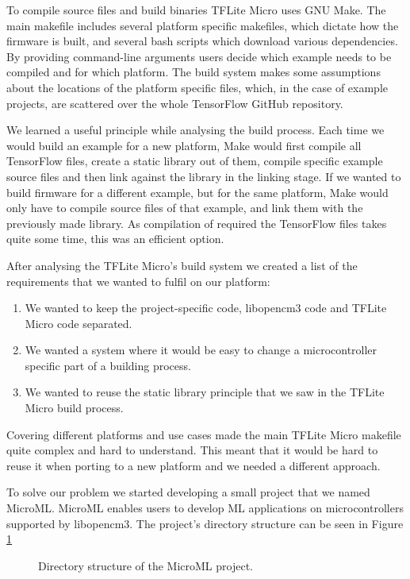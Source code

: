 To compile source files and build binaries TFLite Micro uses GNU Make.
The main makefile includes several platform specific makefiles, which dictate how the firmware is built, and several bash scripts which download various dependencies.
By providing command-line arguments users decide which example needs to be compiled and for which platform.
The build system makes some assumptions about the locations of the platform specific files, which, in the case of example projects, are scattered over the whole TensorFlow GitHub repository.

We learned a useful principle while analysing the build process. 
Each time we would build an example for a new platform, Make would first compile all TensorFlow files, create a static library out of them, compile specific example source files and then link against the library in the linking stage.
If we wanted to build firmware for a different example, but for the same platform, Make would only have to compile source files of that example, and link them with the previously made library.
As compilation of required the TensorFlow files takes quite some time, this was an efficient option.

After analysing the TFLite Micro's build system we created a list of the requirements that we wanted to fulfil on our platform:
\newline
\begin{enumerate}
    \item We wanted to keep the project-specific code, libopencm3 code and TFLite Micro code separated.
    \item We wanted a system where it would be easy to change a microcontroller specific part of a building process.
    \item We wanted to reuse the static library principle that we saw in the TFLite Micro build process.
\end{enumerate}

Covering different platforms and use cases made the main TFLite Micro makefile quite complex and hard to understand.
This meant that it would be hard to reuse it when porting to a new platform and we needed a different approach.

To solve our problem we started developing a small project that we named MicroML\footnotemark.
MicroML enables users to develop ML applications on microcontrollers supported by libopencm3.
The project's directory structure can be seen in Figure \ref{microml_dir}
\newline
\begin{figure}[ht] 
    \centering
    \begin{minipage}{7cm}
    \end{minipage}
    \caption{ Directory structure of the MicroML project.}
    \label{microml_dir}
\end{figure}

